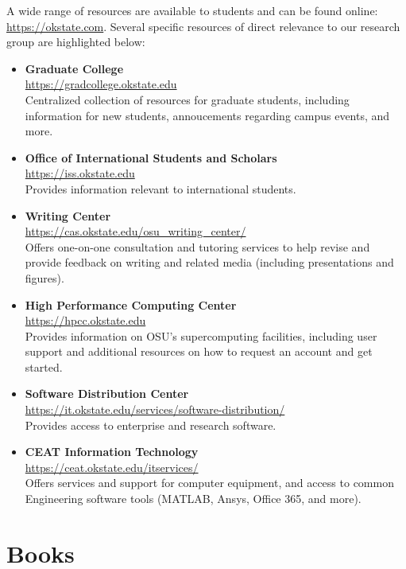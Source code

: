 \documentclass[12pt,a4paper,article,oneside]{memoir} %
\begin{document}
A wide range of resources are available to students and can be found online: \url{https://okstate.com}. Several specific resources of direct relevance to our research group are highlighted below:
\begin{itemize}
\item \textbf{Graduate College} \\ \url{https://gradcollege.okstate.edu} \\ Centralized collection of resources for graduate students, including information for new students, annoucements regarding campus events, and more.
\item \textbf{Office of International Students and Scholars} \\ \url{https://iss.okstate.edu} \\ Provides information relevant to international students.
\item \textbf{Writing Center} \\ \url{https://cas.okstate.edu/osu_writing_center/} \\ Offers one-on-one consultation and tutoring services to help revise and provide feedback on writing and related media (including presentations and figures).
\item \textbf{High Performance Computing Center} \\ \url{https://hpcc.okstate.edu} \\ Provides information on OSU's supercomputing facilities, including user support and additional resources on how to request an account and get started.
\item \textbf{Software Distribution Center }\\ \url{https://it.okstate.edu/services/software-distribution/} \\ Provides access to enterprise and research software.
\item \textbf{CEAT Information Technology} \\ \url{https://ceat.okstate.edu/itservices/} \\ Offers services and support for computer equipment, and access to common Engineering software tools (MATLAB, Ansys, Office 365, and more).
\end{itemize}


\section{Books}
\end{document}
